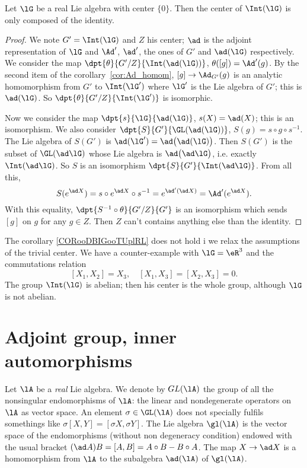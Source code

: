 \begin{corollary}       \label{CORooDBIGooTUplRL}
Let $\lG$ be a real Lie algebra with center $\{0\}$. Then the center of $\Int(\lG)$ is only composed of the identity.
\end{corollary}

\begin{proof}
We note $G'=\Int(\lG)$ and $Z$ his center; $\ad$ is the adjoint representation of $\lG$ and $\Ad'$, $\ad'$, the ones of $G'$ and $\ad(\lG)$ respectively. We consider the map $\dpt{\theta}{G'/Z}{\Int(\ad(\lG))}$, $\theta([g])=\Ad'(g)$. By the second item of the corollary~\ref{cor:Ad_homom}, $[g]\to\Ad_{G'}(g)$ is an analytic homomorphism from $G'$ to $\Int(\lG')$ where $\lG'$ is the Lie algebra of $G'$; this is $\ad(\lG)$. So $\dpt{\theta}{G'/Z}{\Int(\lG')}$ is isomorphic.

Now we consider the map $\dpt{s}{\lG}{\ad(\lG)}$, $s(X)=\ad(X)$; this is an isomorphism. We also consider $\dpt{S}{G'}{ \GL(\ad(\lG))}$, $S(g)=s\circ g\circ s^{-1}$. The Lie algebra of $S(G')$ is $\ad(\lG')=\ad\big(\ad(\lG)\big)$. Then $S(G')$ is the subset of $\GL(\ad\lG)$ whose Lie algebra is $\ad\big(\ad\lG\big)$, i.e. exactly $\Int(\ad\lG)$. So $S$ is an isomorphism $\dpt{S}{G'}{\Int(\ad\lG)}$. From all this,
\begin{equation}
   S(e^{\ad X})=s\circ e^{\ad X}\circ s^{-1}
               =e^{\ad'(\ad X)}
           =\Ad'(e^{\ad X}).
\end{equation}
With this equality, $\dpt{S^{-1}\circ\theta}{G'/Z}{G'}$ is an isomorphism which sends $[g]$ on $g$ for any $g\in Z$. Then $Z$ can't contains anything else than the identity.
\end{proof}

\begin{normaltext}
    The corollary \ref{CORooDBIGooTUplRL} does not hold i we relax the assumptions of the trivial center. We have a counter-example with $\lG=\eR^3$ and the commutations relation
    \[
    [X_1,X_2]=X_3,\quad [X_1,X_3]=[X_2,X_3]=0.
    \]
    The group $\Int(\lG)$ is abelian; then his center is the whole group, although $\lG$ is not abelian.
\end{normaltext}

\section{Adjoint group, inner automorphisms}\label{sec:adj_gp}

Let $\lA$ be a \emph{real} Lie algebra. We denote by $GL(\lA)$ the group of all the nonsingular endomorphisms of $\lA$: the linear and nondegenerate operators on $\lA$ as vector space. An element $\sigma\in\GL(\lA)$ does not specially fulfils somethings like $\sigma[X,Y]=[\sigma X,\sigma Y]$. The Lie algebra $\gl(\lA)$ is the vector space of the endomorphisms (without non degeneracy condition) endowed with the usual bracket $(\ad A)B=[A,B]=A\circ B-B\circ A$. The map $X\to\ad X$ is a homomorphism from $\lA$ to the subalgebra $\ad(\lA)$ of $\gl(\lA)$.

